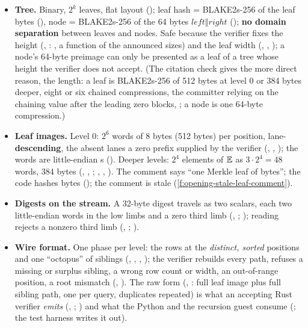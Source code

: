\begin{sloppypar}
\begin{itemize}
\item \textbf{Tree.} Binary, $2^k$ leaves, flat layout (); leaf hash =
  BLAKE2s-256 of the leaf bytes (), node = BLAKE2s-256 of the 64 bytes
  $\mathit{left} ‖ \mathit{right}$ (); \textbf{no domain separation} between leaves and
  nodes. Safe because the verifier fixes the height (, :
  ,  a function of the announced sizes)
  and the leaf width (, , ); a node's 64-byte
  preimage can only be presented as a leaf of a tree whose height the verifier does not accept.
  (The citation check gives the more direct reason, the length: a leaf is BLAKE2s-256 of 512 bytes at
  level 0 or 384 bytes deeper, eight or six chained compressions, the committer relying on the
  chaining value after the leading zero blocks, ; a node is one 64-byte
  compression.)
\item \textbf{Leaf images.} Level 0: $2^6$ words of 8 bytes (512 bytes) per position,
  lane-\textbf{descending}, the absent lanes a zero prefix supplied by the verifier
  (, , ); the words are
  little-endian s (). Deeper levels: $2^4$ elements of $\mathbb{E}$ as
  $3·2^4 = 48$ words, 384 bytes (, , ;
  , , ). The comment  says ``one
  Merkle leaf of  bytes''; the code hashes
   bytes (); the comment is
  stale (\cref{f:opening-stale-leaf-comment}).
\item \textbf{Digests on the stream.} A 32-byte digest travels as two scalars, each two
  little-endian words in the low limbs and a zero third limb (,
  ; ); reading rejects a nonzero third limb
  (, ; ).
\item \textbf{Wire format.} One phase per level: the rows at the \emph{distinct, sorted} positions
  and one ``octopus'' of siblings (, , ,
  ); the verifier rebuilds every path, refuses a missing or surplus sibling, a wrong
  row count or width, an out-of-range position, a root mismatch (, ). The
  raw form (, : full leaf image plus full sibling path, one per
  query, duplicates repeated) is what an accepting Rust verifier \emph{emits}
  (, ; ) and what the
  Python and the recursion guest consume (; the test harness
   writes it out).
\end{itemize}
\end{sloppypar}

